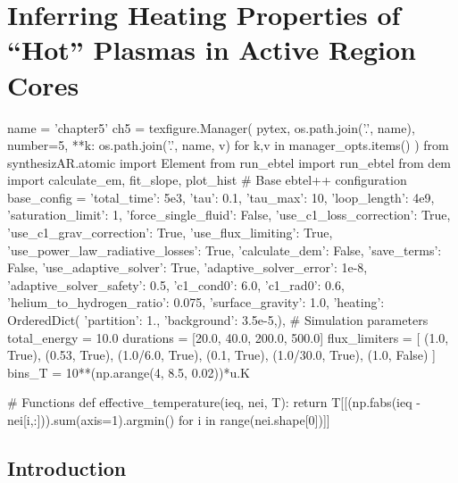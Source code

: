 \chapter{Inferring Heating Properties of ``Hot'' Plasmas in Active Region Cores}\label{ch:inferring_hot_plasma}

\begin{pycode}[chapter5]
name = 'chapter5'
ch5 = texfigure.Manager(
    pytex,
    os.path.join('.', name),
    number=5,
    **{k: os.path.join('.', name, v) for k,v in manager_opts.items()}
)
from synthesizAR.atomic import Element
from run_ebtel import run_ebtel
from dem import calculate_em, fit_slope, plot_hist
# Base ebtel++ configuration
base_config = {
    'total_time': 5e3,
    'tau': 0.1,
    'tau_max': 10,
    'loop_length': 4e9,
    'saturation_limit': 1,
    'force_single_fluid': False,
    'use_c1_loss_correction': True,
    'use_c1_grav_correction': True,
    'use_flux_limiting': True,
    'use_power_law_radiative_losses': True,
    'calculate_dem': False,
    'save_terms': False,
    'use_adaptive_solver': True,
    'adaptive_solver_error': 1e-8,
    'adaptive_solver_safety': 0.5,
    'c1_cond0': 6.0,
    'c1_rad0': 0.6,
    'helium_to_hydrogen_ratio': 0.075,
    'surface_gravity': 1.0,
    'heating': OrderedDict({
        'partition': 1.,
        'background': 3.5e-5,}),
}
# Simulation parameters
total_energy = 10.0
durations = [20.0, 40.0, 200.0, 500.0]
flux_limiters = [
    (1.0, True),
    (0.53, True),
    (1.0/6.0, True),
    (0.1, True),
    (1.0/30.0, True),
    (1.0, False)
]
bins_T = 10**(np.arange(4, 8.5, 0.02))*u.K

# Functions
def effective_temperature(ieq, nei, T):
    return T[[(np.fabs(ieq - nei[i,:])).sum(axis=1).argmin() for i in range(nei.shape[0])]]
\end{pycode}


\section{Introduction}\label{hot-plasma:sec:intro}

